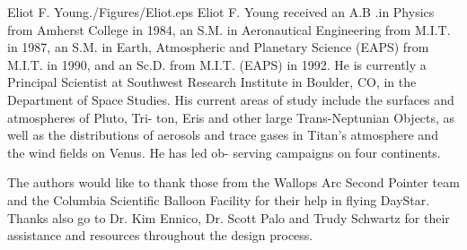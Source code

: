 \documentclass[twocolumn,letterpaper]{IEEEAerospace2012}
\newcommand{\rootdir}{./Figures/}
\begin{document}
\begin{biographywithpic}{Eliot F. Young}{\rootdir Eliot.eps}
Eliot F. Young received an A.B .in
Physics from Amherst College in 1984,
an S.M. in Aeronautical Engineering
from M.I.T. in 1987, an S.M. in Earth,
Atmospheric and Planetary Science
(EAPS) from M.I.T. in 1990, and an
Sc.D. from M.I.T. (EAPS) in 1992. He is
currently a Principal Scientist at
Southwest Research Institute in Boulder,
CO, in the Department of Space Studies. His current areas
of study include the surfaces and atmospheres of Pluto, Tri-
ton, Eris and other large Trans-Neptunian Objects, as well
as the distributions of aerosols and trace gases in Titan's
atmosphere and the wind fields on Venus. He has led ob-
serving campaigns on four continents.
\end{biographywithpic}

\acknowledgments
The authors would like to thank those from the Wallops Arc Second Pointer team and the Columbia Scientific Balloon Facility for their help in flying DayStar. Thanks also go to Dr. Kim Ennico, Dr. Scott Palo and Trudy Schwartz for their assistance and resources throughout the design process.
\end{document}
